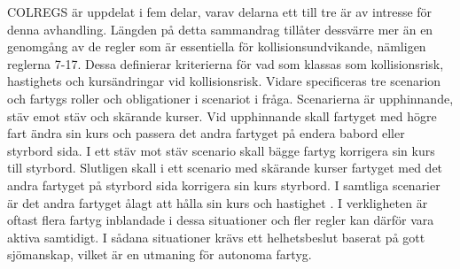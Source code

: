 COLREGS är uppdelat i fem delar, varav delarna ett till tre är av intresse för denna avhandling. Längden på detta sammandrag tillåter dessvärre mer än en genomgång av de regler som är essentiella för kollisionsundvikande, nämligen reglerna 7-17. Dessa definierar kriterierna för vad som klassas som kollisionsrisk, hastighets och kursändringar vid kollisionsrisk. Vidare specificeras tre scenarion och fartygs roller och obligationer i scenariot i fråga. Scenarierna är upphinnande, stäv emot stäv och skärande kurser. Vid upphinnande skall fartyget med högre fart ändra sin kurs och passera det andra fartyget på endera babord eller styrbord sida. I ett stäv mot stäv scenario skall bägge fartyg korrigera sin kurs till styrbord. Slutligen skall i ett scenario med skärande kurser fartyget med det andra fartyget på styrbord sida korrigera sin kurs styrbord. I samtliga scenarier är det andra fartyget ålagt att hålla sin kurs och hastighet \cite{colreg}. I verkligheten är oftast flera fartyg inblandade i dessa situationer och fler regler kan därför vara aktiva samtidigt. I sådana situationer krävs ett helhetsbeslut baserat på gott sjömanskap, vilket är en utmaning för autonoma fartyg.






